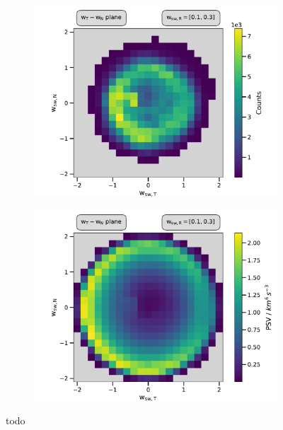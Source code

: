 \begin{figure}
	\centering
	\begin{subfigure}{.5\textwidth}
		\centering
		\includegraphics[width=1\textwidth]{Figures/cart_long_counts.pdf}
	\end{subfigure}%
	\begin{subfigure}{.5\textwidth}
		\centering
		\includegraphics[width=1\textwidth]{Figures/cart_long_norm.pdf}
	\end{subfigure}
	\caption{todo}
	\label{fig:counts_norm_lang}
\end{figure}


